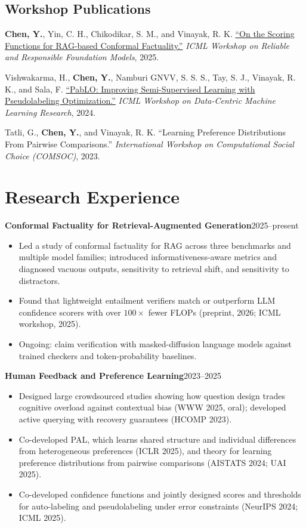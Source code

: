 \documentclass[11pt,letterpaper]{article}
\newcommand{\entry}[2]{\Needspace{4\baselineskip}\textbf{#1}\hfill #2\par}
\newcommand{\me}{\textbf{Chen, Y.}}
\begin{document}
\subsection*{Workshop Publications}
\begin{pubs}[resume]
\item \me, Yin, C. H., Chikodikar, S. M., and Vinayak, R. K.
\href{https://openreview.net/forum?id=BYVo4s8AcE}{``On the Scoring Functions for RAG-based Conformal Factuality.''}
\textit{ICML Workshop on Reliable and Responsible Foundation Models}, 2025.

\item Vishwakarma, H., \me, Namburi GNVV, S. S. S., Tay, S. J., Vinayak, R. K., and Sala, F.
\href{https://openreview.net/forum?id=2Nd3qXcAnJ}{``PabLO: Improving Semi-Supervised Learning with Pseudolabeling Optimization.''}
\textit{ICML Workshop on Data-Centric Machine Learning Research}, 2024.

\item Tatli, G., \me, and Vinayak, R. K.
``Learning Preference Distributions From Pairwise Comparisons.''
\textit{International Workshop on Computational Social Choice (COMSOC)}, 2023.
\end{pubs}

\section*{Research Experience}
\entry{Conformal Factuality for Retrieval-Augmented Generation}{2025--present}
\begin{itemize}
\item Led a study of conformal factuality for RAG across three benchmarks and multiple model families; introduced informativeness-aware metrics and diagnosed vacuous outputs, sensitivity to retrieval shift, and sensitivity to distractors.
\item Found that lightweight entailment verifiers match or outperform LLM confidence scorers with over $100\times$ fewer FLOPs (preprint, 2026; ICML workshop, 2025).
\item Ongoing: claim verification with masked-diffusion language models against trained checkers and token-probability baselines.
\end{itemize}
\entry{Human Feedback and Preference Learning}{2023--2025}
\begin{itemize}
\item Designed large crowdsourced studies showing how question design trades cognitive overload against contextual bias (WWW 2025, oral); developed active querying with recovery guarantees (HCOMP 2023).
\item Co-developed PAL, which learns shared structure and individual differences from heterogeneous preferences (ICLR 2025), and theory for learning preference distributions from pairwise comparisons (AISTATS 2024; UAI 2025).
\item Co-developed confidence functions and jointly designed scores and thresholds for auto-labeling and pseudolabeling under error constraints (NeurIPS 2024; ICML 2025).
\end{itemize}
\end{document}
